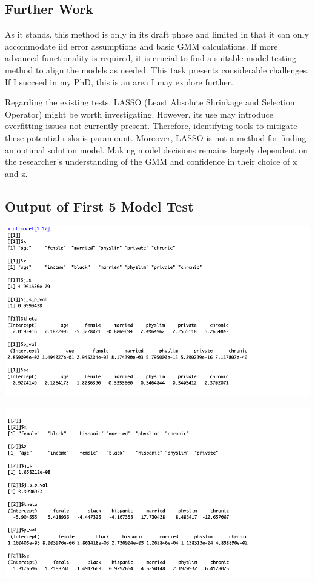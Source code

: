 \documentclass[12pt]{article}
\begin{document}
\subsection{Further Work}
As it stands, this method is only in its draft phase and limited in that it can only accommodate iid error assumptions and basic GMM calculations. If more advanced functionality is required, it is crucial to find a suitable model testing method to align the models as needed. This task presents considerable challenges. If I succeed in my PhD, this is an area I may explore further.

Regarding the existing tests, LASSO (Least Absolute Shrinkage and Selection Operator) might be worth investigating. However, its use may introduce overfitting issues not currently present. Therefore, identifying tools to mitigate these potential risks is paramount. Moreover, LASSO is not a method for finding an optimal solution model. Making model decisions remains largely dependent on the researcher's understanding of the GMM and confidence in their choice of x and z.


\subsection{Output of First 5 Model Test}
\hypertarget{Y}{ }

\includegraphics{1.png}

\includegraphics{2.png}
\end{document}
